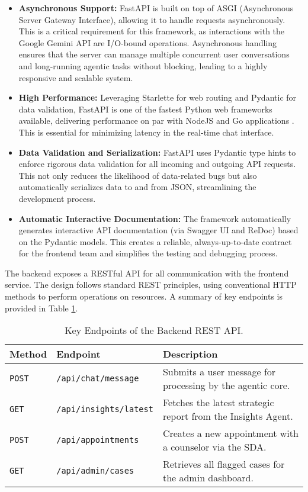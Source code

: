 \begin{itemize}
    \item \textbf{Asynchronous Support:} FastAPI is built on top of ASGI (Asynchronous Server Gateway Interface), allowing it to handle requests asynchronously. This is a critical requirement for this framework, as interactions with the Google Gemini API are I/O-bound operations. Asynchronous handling ensures that the server can manage multiple concurrent user conversations and long-running agentic tasks without blocking, leading to a highly responsive and scalable system.
    \item \textbf{High Performance:} Leveraging Starlette for web routing and Pydantic for data validation, FastAPI is one of the fastest Python web frameworks available, delivering performance on par with NodeJS and Go applications \cite{ramirez2023fastapi, tiangolo2022fastapi}. This is essential for minimizing latency in the real-time chat interface.
    \item \textbf{Data Validation and Serialization:} FastAPI uses Pydantic type hints to enforce rigorous data validation for all incoming and outgoing API requests. This not only reduces the likelihood of data-related bugs but also automatically serializes data to and from JSON, streamlining the development process.
    \item \textbf{Automatic Interactive Documentation:} The framework automatically generates interactive API documentation (via Swagger UI and ReDoc) based on the Pydantic models. This creates a reliable, always-up-to-date contract for the frontend team and simplifies the testing and debugging process.
\end{itemize}

The backend exposes a RESTful API for all communication with the frontend service. The design follows standard REST principles, using conventional HTTP methods to perform operations on resources. A summary of key endpoints is provided in Table \ref{tab:api_endpoints}.

\begin{table}[h]
    \centering
    \caption{Key Endpoints of the Backend REST API.}
    \label{tab:api_endpoints}
    \begin{tabular}{lll}
        \toprule
        \textbf{Method} & \textbf{Endpoint} & \textbf{Description} \\
        \midrule
        \texttt{POST} & \texttt{/api/chat/message} & Submits a user message for processing by the agentic core. \\
        \texttt{GET} & \texttt{/api/insights/latest} & Fetches the latest strategic report from the Insights Agent. \\
        \texttt{POST} & \texttt{/api/appointments} & Creates a new appointment with a counselor via the SDA. \\
        \texttt{GET} & \texttt{/api/admin/cases} & Retrieves all flagged cases for the admin dashboard. \\
        \bottomrule
    \end{tabular}
\end{table}

